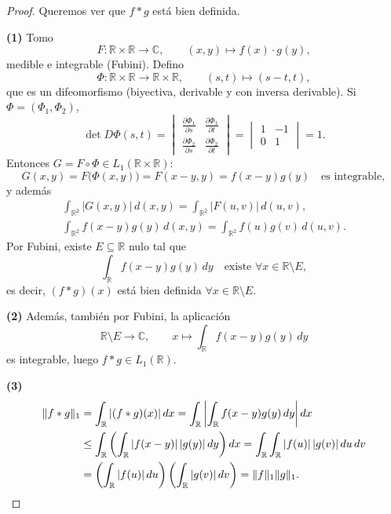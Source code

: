 \begin{proof}
Queremos ver que $f * g$ está bien definida.

\textbf{(1)} Tomo
\[
F : \mathbb{R}\times\mathbb{R} \to \mathbb{C}, \qquad (x, y) \mapsto f(x)\cdot g(y),
\]
medible e integrable (Fubini). Defino
\[
\Phi : \mathbb{R}\times\mathbb{R} \to \mathbb{R}\times\mathbb{R}, \qquad (s, t) \mapsto (s - t, t),
\]
que es un difeomorfismo (biyectiva, derivable y con inversa derivable). Si $\Phi = (\Phi_1, \Phi_2)$,
\[
\det D\Phi(s, t) = \begin{vmatrix} \frac{\partial\Phi_1}{\partial s} & \frac{\partial\Phi_1}{\partial t} \\[4pt] \frac{\partial\Phi_2}{\partial s} & \frac{\partial\Phi_2}{\partial t} \end{vmatrix} = \begin{vmatrix} 1 & -1 \\ 0 & 1 \end{vmatrix} = 1.
\]
Entonces $G = F\circ\Phi \in L_1(\mathbb{R}\times\mathbb{R})$:
\[
G(x, y) = F\big(\Phi(x, y)\big) = F(x - y, y) = f(x - y)g(y) \quad \text{es integrable},
\]
y además
\begin{gather*}
\int_{\mathbb{R}^2}|G(x, y)|\,d(x, y) = \int_{\mathbb{R}^2}|F(u, v)|\,d(u, v), \\
\int_{\mathbb{R}^2}f(x - y)g(y)\,d(x, y) = \int_{\mathbb{R}^2}f(u)g(v)\,d(u, v).
\end{gather*}
Por Fubini, existe $E \subseteq \mathbb{R}$ nulo tal que
\[
\int_{\mathbb{R}}f(x - y)g(y)\,dy \quad \text{existe } \forall x \in \mathbb{R}\setminus E,
\]
es decir, $(f * g)(x)$ está bien definida $\forall x \in \mathbb{R}\setminus E$.

\textbf{(2)} Además, también por Fubini, la aplicación
\[
\mathbb{R}\setminus E \longrightarrow \mathbb{C}, \qquad x \longmapsto \int_{\mathbb{R}}f(x - y)g(y)\,dy
\]
es integrable, luego $f * g \in L_1(\mathbb{R})$.

\textbf{(3)}
\begin{align*}
\|f * g\|_1 &= \int_{\mathbb{R}}|(f * g)(x)|\,dx = \int_{\mathbb{R}}\left|\int_{\mathbb{R}}f(x - y)g(y)\,dy\right|dx \\
&\le \int_{\mathbb{R}}\left(\int_{\mathbb{R}}|f(x - y)|\,|g(y)|\,dy\right)dx = \int_{\mathbb{R}}\int_{\mathbb{R}}|f(u)|\,|g(v)|\,du\,dv \\
&= \left(\int_{\mathbb{R}}|f(u)|\,du\right)\left(\int_{\mathbb{R}}|g(v)|\,dv\right) = \|f\|_1\|g\|_1. \qedhere
\end{align*}
\end{proof}

